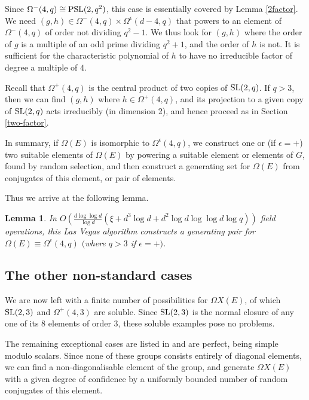 \documentclass[12pt]{article}
\newtheorem{lemma}[definition]{Lemma}
\def\SL{{\rm SL}}
\def\Oh{O}  %
\def\PSL{{\rm PSL}}
\begin{document}
Since $\Omega^-(4,q) \cong \PSL(2,q^2)$, this case is
essentially covered by Lemma \ref{2factor}.
We need $(g, h) \in \Omega^-(4,q)\times\Omega^\epsilon(d-4,q)$ 
that powers to an element of $\Omega^-(4,q)$ of order not dividing $q^2-1$.
We thus look for $(g,h)$ where the order of 
$g$ is a multiple of an odd prime dividing $q^2+1$, and the 
order of $h$ is not.
It is sufficient for the characteristic polynomial of $h$ 
to have no irreducible factor of degree a multiple of $4$.

Recall that 
$\Omega^+(4,q)$ is the central product of two copies of $\SL(2,q)$.  
If $q > 3$, then we can find $(g, h)$ where 
$h \in \Omega^+(4,q)$, and its projection to a given copy 
of $\SL(2,q)$ acts irreducibly (in dimension 2), and hence proceed as 
in Section \ref{two-factor}.  

In summary, if $\Omega(E)$ is isomorphic to $\Omega^\epsilon(4,q)$, 
we construct one or (if $\epsilon=+$) two suitable elements of $\Omega(E)$
by powering a suitable element or elements of $G$, found by 
random selection, and 
then construct a generating set for $\Omega(E)$ from conjugates of
this element, or pair of elements.

Thus we arrive at the following lemma.
\begin{lemma} In 
$\Oh(\frac{d \log\log d}{\log d} 
(\xi +d^3\log d + d^2 \log d \log\log d \log q))$ field operations,
this Las Vegas algorithm constructs a 
generating pair for $\Omega(E)\equiv\Omega^\epsilon(4,q)$ 
$($where $q>3$ if $\epsilon=+)$. 
\end{lemma}

\subsection{The other non-standard cases}
We are now left with a finite number of possibilities 
for $\Omega X(E)$, 
of which $\SL(2,3)$ and $\Omega^+(4,3)$ are soluble.
Since $\SL(2, 3)$ is the normal closure 
of any one of its 8 elements of order 3, 
these soluble examples pose no problems.

The remaining exceptional cases are listed in \cite{NP}
and are perfect, being simple modulo scalars.  
Since none of these groups consists entirely of diagonal elements,
we can find a 
non-diagonalisable element of the group, and generate
$\Omega X(E)$ with a given degree of confidence by a uniformly bounded 
number of random conjugates of this element.
\end{document}
